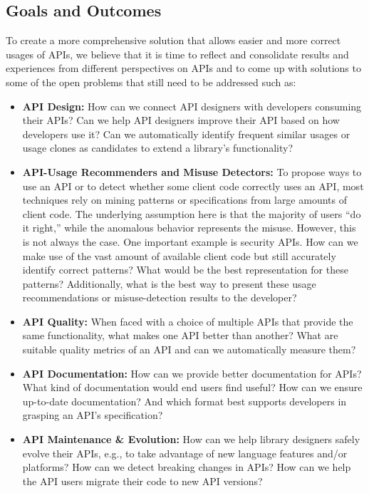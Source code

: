 \documentclass[sigconf]{acmart}
\begin{document}
\subsection{Goals and Outcomes}\label{sec:goals}
To create a more comprehensive solution that allows easier and more correct usages of APIs, we believe that it is time to reflect and consolidate results and experiences from different perspectives on APIs and to come up with solutions to some of the open problems that still need to be addressed such as:

\begin{itemize}
\setlength\itemsep{5pt}

\item \textbf{API Design:} How can we connect API designers with developers consuming their APIs? Can we help API designers improve their API based on how developers use it? Can we automatically identify frequent similar usages or usage clones as candidates to extend a library's functionality?

\item \textbf{API-Usage Recommenders and Misuse Detectors:} To propose ways to use an API or to detect whether some client code correctly uses an API, most techniques rely on mining patterns or specifications from large amounts of client code. The underlying assumption here is that the majority of users ``do it right,'' while the anomalous behavior represents the misuse. However, this is not always the case. One important example is security APIs. How can we make use of the vast amount of available client code but still accurately identify correct patterns? What would be the best representation for these patterns? Additionally, what is the best way to present these usage recommendations or misuse-detection results to the developer? 

\item \textbf{API Quality:} When faced with a choice of multiple APIs that provide the same functionality, what makes one API better than another? What are suitable quality metrics of an API and can we automatically measure them?

\item\textbf{API Documentation:} How can we provide better documentation for APIs? What kind of documentation would end users find useful? How can we ensure up-to-date documentation? And which format best supports developers in grasping an API's specification?

\item \textbf{API Maintenance \& Evolution:} How can we help library designers safely evolve their APIs, e.g., to take advantage of new language features and/or platforms? How can we detect breaking changes in APIs? How can we help the API users migrate their code to new API versions?

\end{itemize}
\end{document}
